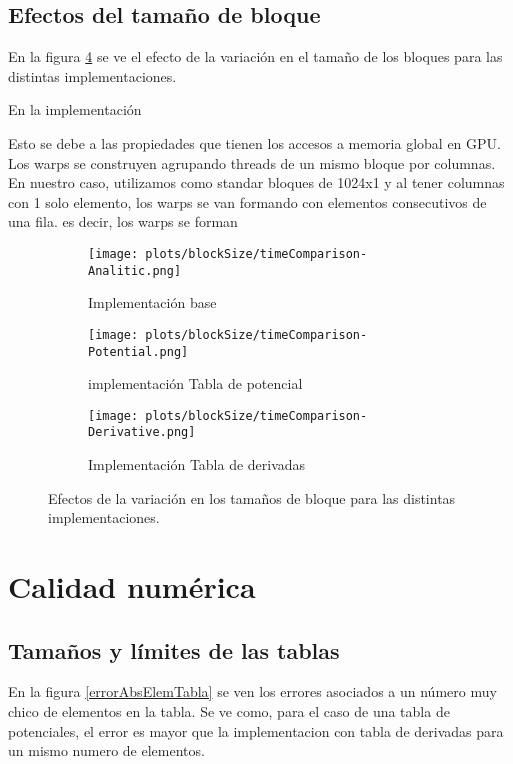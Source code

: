 \subsection{Efectos del tamaño de bloque}

En la figura \ref{blockSize} se ve el efecto de la variación en el tamaño de los bloques para las distintas implementaciones.

En la implementación

Esto se debe a las propiedades que tienen los accesos a memoria global en GPU. Los warps se construyen agrupando threads de un mismo bloque por columnas. 
En nuestro caso, utilizamos como standar bloques de 1024x1 y al tener columnas con 1 solo elemento, los warps se van formando con elementos consecutivos de una fila. es decir, los warps se forman

\begin{figure}[htbp]
\centering
\begin{subfigure}[b]{\plotwidthtres}
   \texttt{[image: plots/blockSize/timeComparison-Analitic.png]}
   \caption{Implementación base}
   \label{fig:cpu-scalability-caroteno}
 \end{subfigure}
\begin{subfigure}[b]{\plotwidthtres}
   \texttt{[image: plots/blockSize/timeComparison-Potential.png]}
   \caption{implementación Tabla de potencial}
   \label{fig:cpu-scalability-fullereno}
 \end{subfigure}
\begin{subfigure}[b]{\plotwidthtres}
   \texttt{[image: plots/blockSize/timeComparison-Derivative.png]}
   \caption{Implementación Tabla de derivadas}
   \label{fig:cpu-scalability-hemo}
 \end{subfigure}
 \caption{Efectos de la variación en los tamaños de bloque para las distintas implementaciones.}
 \label{blockSize}
\end{figure}


\section{Calidad numérica}

\subsection{Tamaños y límites de las tablas}
En la figura \ref{errorAbsElemTabla} se ven los errores asociados a un número muy chico de elementos en la tabla. 
Se ve como, para el caso de una tabla de potenciales, el error es mayor que la implementacion con tabla de derivadas
para un mismo numero de elementos.

